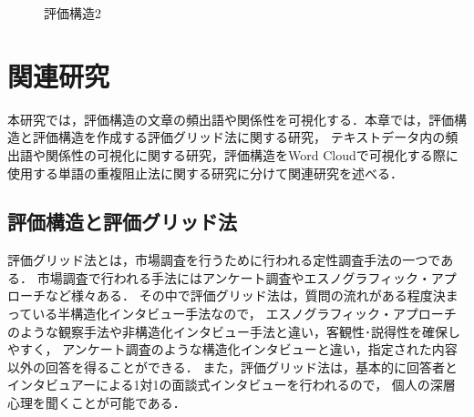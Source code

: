 \documentclass[syuuron]{kuee}
\begin{document}
		\begin{figure}
			\begin{center}
			\end{center}
			\caption{評価構造2}
	  		\label{fig:es3}
		\end{figure}

\chapter{関連研究}
	本研究では，評価構造の文章の頻出語や関係性を可視化する．本章では，評価構造と評価構造を作成する評価グリッド法に関する研究，
	テキストデータ内の頻出語や関係性の可視化に関する研究，評価構造をWord Cloudで可視化する際に使用する単語の重複阻止法に関する研究に分けて関連研究を述べる．
	\section{評価構造と評価グリッド法}
		評価グリッド法とは，市場調査を行うために行われる定性調査手法の一つである．
		市場調査で行われる手法にはアンケート調査やエスノグラフィック・アプローチなど様々ある．
		その中で評価グリッド法は，質問の流れがある程度決まっている半構造化インタビュー手法なので，
		エスノグラフィック・アプローチのような観察手法や非構造化インタビュー手法と違い，客観性･説得性を確保しやすく，
		アンケート調査のような構造化インタビューと違い，指定された内容以外の回答を得ることができる．
		また，評価グリッド法は，基本的に回答者とインタビュアーによる1対1の面談式インタビューを行われるので，
		個人の深層心理を聞くことが可能である．
		
\end{document}
